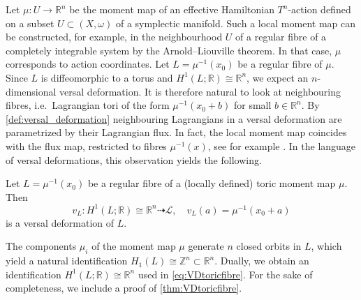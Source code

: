 \documentclass[12pt,a4paper,draft]{scrartcl}
\begin{document}
Let $\mu \colon U \rightarrow \mathbb{R}^n$ be the moment map of an effective Hamiltonian $T^n$-action defined on a subset $U \subset (X,\omega)$ of a symplectic manifold.
Such a local moment map can be constructed, for example, in the neighbourhood $U$ of a regular fibre of a completely integrable system by the Arnold--Liouville theorem.
In that case, $\mu$ corresponds to action coordinates.
Let $L = \mu^{-1}(x_0)$ be a regular fibre of $\mu$.
Since $L$ is diffeomorphic to a torus and $H^1(L;\mathbb{R}) \cong \mathbb{R}^n$, we expect an $n$-dimensional versal deformation.
It is therefore natural to look at neighbouring fibres, i.e.\ Lagrangian tori of the form $\mu^{-1}(x_0 + b)$ for small $b \in \mathbb{R}^n$.
By \cref{def:versal_deformation} neighbouring Lagrangians in a versal deformation are parametrized by their Lagrangian flux.
In fact, the local moment map coincides with the flux map, restricted to fibres $\mu^{-1}(x)$, see for example \cite[Lemma 2.15]{evans2021atfs}.
In the language of versal deformations, this observation yields the following.

\begin{proposition}
\label{thm:VDtoricfibre}
    Let $L = \mu^{-1}(x_0)$ be a regular fibre of a (locally defined) toric moment map $\mu$.
Then
    \begin{equation}
        \label{eq:VDtoricfibre}
        v_{L} \colon H^1(L;\mathbb{R}) \cong \mathbb{R}^n \dashrightarrow \mathcal{L}, \quad
        v_{L}(a) = \mu^{-1}(x_0 + a)
    \end{equation}
    is a versal deformation of $L$. 
\end{proposition}

The components $\mu_i$ of the moment map $\mu$ generate $n$ closed orbits in $L$, which yield a natural identification $H_1(L) \cong \mathbb{Z}^n \subset \mathbb{R}^n$.
Dually, we obtain an identification $H^1(L;\mathbb{R}) \cong \mathbb{R}^n$ used in \eqref{eq:VDtoricfibre}.
For the sake of completeness, we include a proof of \cref{thm:VDtoricfibre}.
\end{document}
